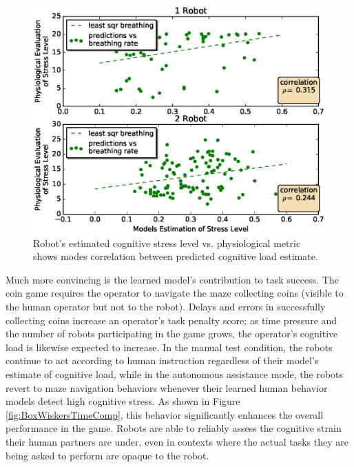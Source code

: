 \documentclass{sig-alternate}
\begin{document}

\begin{figure}  
\centering
\includegraphics[width=.5\textwidth]{prediction_vs_b_p_2.eps}
\caption{Robot's estimated cognitive stress level vs. physiological metric shows modes correlation between predicted cognitive load estimate.}
\label{fig:pred_phy}
\end{figure}

Much more convincing is the learned model's contribution to task
success.  The coin game requires the operator to navigate the maze collecting coins (visible to the human operator but not to the robot).  Delays and errors in successfully collecting coins increase an operator's task penalty score; as time pressure and the number of robots participating in the game grows, the operator's cognitive load is likewise expected to increase.  In the manual test condition, the robots continue to act according to human instruction regardless of their model's estimate of cognitive load, while in the autonomous assistance mode, the robots revert to maze navigation behaviors whenever their learned human behavior models detect high cognitive stress.  As shown in Figure \ref{fig:BoxWiskersTimeComp}, this behavior significantly enhances the overall performance in the game.  Robots are able to reliably assess the cognitive strain their human partners are under, even in contexts where the actual tasks they are being asked to perform are opaque to the robot.
\end{document}
